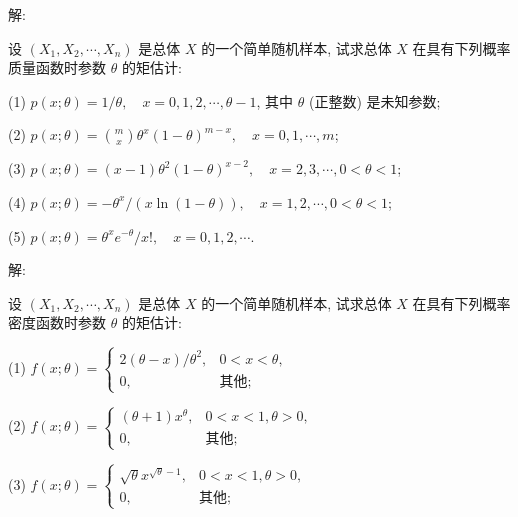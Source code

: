 \documentclass[standard]{ExBook}
\begin{document}
\begin{qitems}
    \begin{bbox}
解: 
    \end{bbox}

\vspace{-5em}

    \begin{bbox}
    \begin{shaded}
        \qitem
设 \((X_1, X_2, \cdots, X_n)\) 是总体 \(X\) 的一个简单随机样本, 试求总体 \(X\) 在具有下列概率质量函数时参数 \(\theta\) 的矩估计:

(1) \(p(x; \theta) = 1/\theta, \quad x = 0, 1, 2, \cdots, \theta - 1\), 其中 \(\theta\) (正整数) 是未知参数;

(2) \(p(x; \theta) = \displaystyle\binom{m}{x} \theta^x (1 - \theta)^{m - x}, \quad x = 0, 1, \cdots, m\);

(3) \(p(x; \theta) = (x - 1) \theta^2 (1 - \theta)^{x - 2}, \quad x = 2, 3, \cdots, 0 < \theta < 1\);

(4) \(p(x; \theta) = -\theta^x / \left(x \ln (1 - \theta)\right), \quad x = 1, 2, \cdots, 0 < \theta < 1\);

(5) \(p(x; \theta) = \theta^x e^{-\theta} / x!, \quad x = 0, 1, 2, \cdots\).
    \end{shaded}
    \end{bbox}

\vspace{-5em}

    \begin{bbox}
解: 
    \end{bbox}

\vspace{-5em}

    \begin{bbox}
    \begin{shaded}
        \qitem
设 \((X_1, X_2, \cdots, X_n)\) 是总体 \(X\) 的一个简单随机样本, 试求总体 \(X\) 在具有下列概率密度函数时参数 \(\theta\) 的矩估计:

(1) \(f(x; \theta) = 
\begin{cases} 
2(\theta - x)/\theta^2, & 0 < x < \theta, \\
0, & \text{其他};
\end{cases}\)

(2) \(f(x; \theta) = 
\begin{cases} 
(\theta + 1)x^{\theta}, & 0 < x < 1, \theta > 0, \\
0, & \text{其他};
\end{cases}\)

(3) \(f(x; \theta) = 
\begin{cases} 
\sqrt{\theta}x^{\sqrt{\theta}-1}, & 0 < x < 1, \theta > 0, \\
0, & \text{其他};
\end{cases}\)


\end{shaded}
\end{bbox}
\end{qitems}
\end{document}
